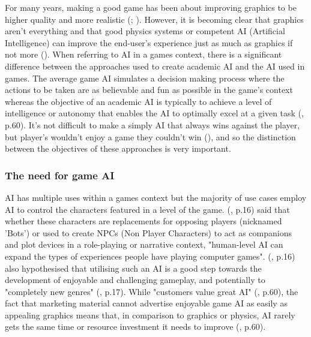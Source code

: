 \documentclass[10pt]{article}
\begin{document}
For many years, making a good game has been about improving graphics to be higher quality and more realistic (\cite{yap2002grid}; \cite{blow2004game}). However, it is becoming clear that graphics aren't everything and that good physics systems or competent AI (Artificial Intelligence) can improve the end-user's experience just as much as graphics if not more (\cite{blow2004game}). When referring to AI in a games context, there is a significant difference between the approaches used to create academic AI and the AI used in games. The average game AI simulates a decision making process where the actions to be taken are as believable and fun as possible in the game's context whereas the objective of an academic AI is typically to achieve a level of intelligence or autonomy that enables the AI to optimally excel at a given task (\cite{nareyek2004ai}, p.60). It's not difficult to make a simply AI that always wins against the player, but player's wouldn't enjoy a game they couldn't win (\cite{tozour2002evolution}), and so the distinction between the objectives of these approaches is very important.

\subsubsection{The need for game AI}

AI has multiple uses within a games context but the majority of use cases employ AI to control the characters featured in a level of the game. \citeauthor{laird2001human} (\citeyear{laird2001human}, p.16) said that whether these characters are replacements for opposing players (nicknamed 'Bots') or used to create NPCs (Non Player Characters) to act as companions and plot devices in a role-playing or narrative context, "human-level AI can expand the types of experiences people have playing computer games". \citeauthor{laird2001human} (\citeyear{laird2001human}, p.16) also hypothesised that utilising such an AI is a good step towards the development of enjoyable and challenging gameplay, and potentially to "completely new genres" (\cite{laird2001human}, p.17). While "customers value great AI" (\cite{nareyek2004ai}, p.60), the fact that marketing material cannot advertise enjoyable game AI as easily as appealing graphics means that, in comparison to graphics or physics, AI rarely gets the same time or resource investment it needs to improve (\cite{nareyek2004ai}, p.60).
\end{document}

